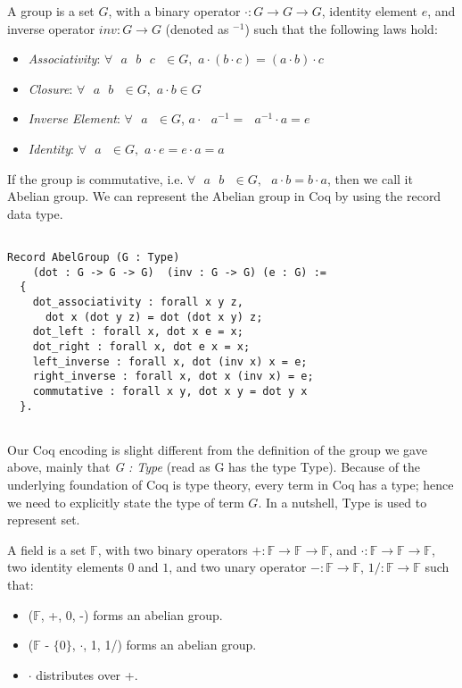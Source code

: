 \begin{definition}[Group] 
A group is a set $G$, with a binary operator $\cdot : G \rightarrow G \rightarrow G$, identity element $e$, and inverse operator $inv : G \rightarrow G$ (denoted as $^{-1}$) such 
    that the following laws hold:  \end{definition} 
    \begin{itemize}
     \item \textit{Associativity}: $\forall \text{  }a \text{  }b \text{  }c \text{  } \in G,$  $a \cdot (b \cdot c) = (a \cdot b) \cdot c$
    \item \textit{Closure}: $\forall \text{  } a \text{  } b \text{  } \in G,$  $a \cdot b \in G$
    \item \textit{Inverse Element}: $\forall \text{  } a \text{  } \in G$, $a \cdot \text{ } a^{-1} = \text{ } a^{-1} \cdot a = e$
    \item \textit{Identity}: $\forall \text{  } a \text{  } \in G,$  $a \cdot e = e \cdot a  = a$
    \end{itemize}
  
    \noindent
    If the group is commutative, i.e. $\forall \text{  } a \text{  }b \text{  }\in  G, \text{   } a \cdot b = b \cdot a$, then we call it Abelian group.  We can represent the Abelian group in Coq by using the 
    record data type. 
 
 \begin{verbatim}

Record AbelGroup (G : Type)
    (dot : G -> G -> G)  (inv : G -> G) (e : G) :=
  {
    dot_associativity : forall x y z, 
      dot x (dot y z) = dot (dot x y) z;
    dot_left : forall x, dot x e = x;
    dot_right : forall x, dot e x = x;
    left_inverse : forall x, dot (inv x) x = e;
    right_inverse : forall x, dot x (inv x) = e;
    commutative : forall x y, dot x y = dot y x
  }.
  
\end{verbatim}

\noindent
Our Coq encoding is slight different from the definition of the group we gave above, mainly that \textit{G : Type} (read as G has the type Type). 
Because of the underlying foundation of Coq is type theory, every term in Coq has a type;
hence we need to explicitly state the type of term $G$.  In a nutshell, Type is used to represent set.  

\begin{definition}[Field] 
A field  is a set $\mathbb{F}$, with two binary operators $+ : \mathbb{F} \rightarrow \mathbb{F} \rightarrow \mathbb{F}$,  and $\cdot : \mathbb{F} \rightarrow \mathbb{F} \rightarrow \mathbb{F}$, 
two identity elements $0$ and $1$, and two unary operator $- : \mathbb{F} \rightarrow \mathbb{F}$, $1/ : \mathbb{F} \rightarrow \mathbb{F}$  such that:
\end{definition} 
 \begin{itemize}
 \item ($\mathbb{F}$, +, 0, -) forms an abelian group.
 \item ($\mathbb{F}$ - $\lbrace 0 \rbrace$, $\cdot$, 1, 1/) forms an abelian group.
 \item $\cdot$ distributes over +.
 \end{itemize}
 
